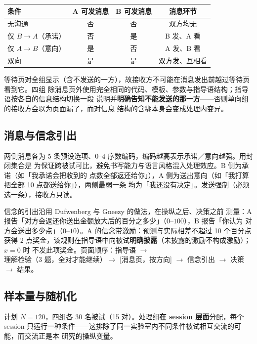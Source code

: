 \documentclass[10pt,a4paper]{ctexart}
\begin{document}
\begin{table}[h]
\centering\small
\begin{tabular}{lccc}
\toprule
条件 & A 可发消息 & B 可发消息 & 消息环节 \\
\midrule
无沟通     & 否 & 否 & 双方均无 \\
仅 $B\!\rightarrow\!A$（承诺） & 否 & 是 & B 发、A 看 \\
仅 $A\!\rightarrow\!B$（意向） & 是 & 否 & A 发、B 看 \\
双向       & 是 & 是 & 双方发、互相看 \\
\bottomrule
\end{tabular}
\end{table}

等待页对全组显示（含不发送的一方），故接收方不可能在消息发出前越过等待页看到它。四组
除消息页外使用完全相同的代码、模板、参数与指导语结构；指导语按各自的信息结构切换一段
说明并\textbf{明确告知不能发送的那一方}——否则单向组的接收方会以为页面漏了，而对信息
结构的含糊本身会变成处理内变异。

\subsection{消息与信念引出}

两侧消息各为 5 条预设选项、$0$--$4$ 序数编码，编码越高表示承诺／意向越强。用封闭集合是
为保证跨被试可比，避免书写能力与语言风格混入处理效应。B 侧为承诺（如「我承诺会把收到的
点数全部返还给你」），A 侧为送出意向（如「我打算把全部 10 点都送给你」），两侧最弱一条
均为「我还没有决定」。发送强制（必须选一条），接收方只读。

信念的引出沿用 Dufwenberg 与 Gneezy\cite{dufwenberg2000} 的做法，在操纵之后、决策之前
测量：A 报告「对方会返还你送出金额放大后的百分之多少」（$0$--$100$），B 报告「你认为
对方会送出多少点」（$0$--$10$）。A 的信念带激励：预测与实际相差不超过 10 个百分点获得
2 点奖金，该规则在指导语中向被试\textbf{明确披露}（未披露的激励不构成激励）；$x=0$ 时
不发此项奖金。页面顺序：指导语 $\rightarrow$ 理解检验（3 题，全对才能继续）$\rightarrow$
[消息页，按方向] $\rightarrow$ 信念引出 $\rightarrow$ 决策 $\rightarrow$ 结果。

\subsection{样本量与随机化}

计划 $N=120$，四组各 30 名被试（15 对）。处理组\textbf{在 session 层面}分配，每个
session 只运行一种条件——这排除了同一实验室内不同条件被试相互交流的可能，而交流正是本
研究的操纵变量。
\end{document}

